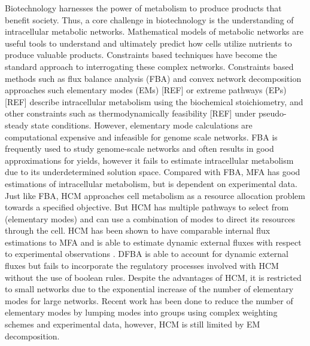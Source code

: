 \documentclass[10pt,twocolumn,twoside,final]{IEEEtran}
\begin{document}
Biotechnology harnesses the power of metabolism to produce products that benefit society.
Thus, a core challenge in biotechnology is the understanding of intracellular metabolic networks.
Mathematical models of metabolic networks are useful tools to understand and ultimately predict how cells utilize nutrients to produce valuable products.
Constraints based techniques have become the standard approach to interrogating these complex networks.
Constraints based methods such as flux balance analysis (FBA) \cite{2010_orth_NatBiotech} and convex network decomposition approaches such elementary modes (EMs) [REF] or extreme pathways (EPs) [REF] describe intracellular metabolism using the biochemical stoichiometry, and other constraints such as thermodynamically feasibility [REF]
under pseudo-steady state conditions.
However, elementary mode calculations are computational expensive and infeasible for genome scale networks\cite{2004_lee_varner_ko_ieee}.
FBA is frequently used to study genome-scale networks and often results in good approximations for yields, however it fails to estimate intracellular metabolism due to its underdetermined solution space.
Compared with FBA, MFA has good estimations of intracellular metabolism, but is dependent on experimental data.
Just like FBA, HCM approaches cell metabolism as a resource allocation problem towards a specified objective.
But HCM has multiple pathways to select from (elementary modes) and can use a combination of modes to direct its resources through the cell.
HCM has been shown to have comparable internal flux estimations to MFA and is able to estimate dynamic external fluxes with respect to experimental observations \cite{2008_kim_varner_ramkrishna_BiotechProg}.
DFBA is able to account for dynamic external fluxes but fails to incorporate the regulatory processes involved with HCM without the use of boolean rules\cite{2001_covert_schilling_palsson}.
Despite the advantages of HCM, it is restricted to small networks due to the exponential increase of the number of elementary modes for large networks.
Recent work has been done to reduce the number of elementary modes by lumping modes into groups using complex weighting schemes and experimental data\cite{2010_song_ramkrishna}, however, HCM is still limited by EM decomposition.
\end{document}
